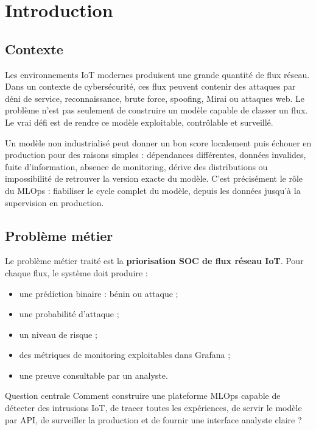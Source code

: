 \chapter{Introduction}

\section{Contexte}
Les environnements IoT modernes produisent une grande quantité de flux réseau. Dans un contexte de cybersécurité, ces flux peuvent contenir des attaques par déni de service, reconnaissance, brute force, spoofing, Mirai ou attaques web. Le problème n'est pas seulement de construire un modèle capable de classer un flux. Le vrai défi est de rendre ce modèle exploitable, contrôlable et surveillé.

Un modèle non industrialisé peut donner un bon score localement puis échouer en production pour des raisons simples : dépendances différentes, données invalides, fuite d'information, absence de monitoring, dérive des distributions ou impossibilité de retrouver la version exacte du modèle. C'est précisément le rôle du MLOps : fiabiliser le cycle complet du modèle, depuis les données jusqu'à la supervision en production.

\section{Problème métier}
Le problème métier traité est la \textbf{priorisation SOC de flux réseau IoT}. Pour chaque flux, le système doit produire :
\begin{itemize}
  \item une prédiction binaire : bénin ou attaque ;
  \item une probabilité d'attaque ;
  \item un niveau de risque ;
  \item des métriques de monitoring exploitables dans Grafana ;
  \item une preuve consultable par un analyste.
\end{itemize}

\begin{cyberbox}{Question centrale}
Comment construire une plateforme MLOps capable de détecter des intrusions IoT, de tracer toutes les expériences, de servir le modèle par API, de surveiller la production et de fournir une interface analyste claire ?
\end{cyberbox}

